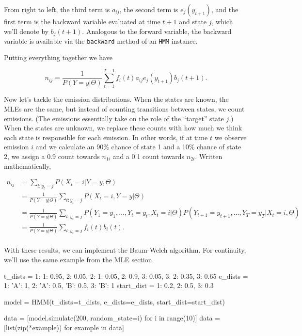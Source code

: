 From right to left, the third term is $a_{ij}$, the second term is $e_j(y_{t+1})$, and the first term is the backward variable evaluated at time $t+1$ and state $j$, which we'll denote by $b_j(t+1)$. Analogous to the forward variable, the backward variable is available via the \texttt{backward} method of an \texttt{HMM} instance.

Putting everything together we have

\begin{equation*}
n_{ij} = \frac{1}{P(Y=y|\Theta)} \sum_{t=1}^{T-1} f_i(t)a_{ij}e_j(y_{t+1})b_j(t+1).
\end{equation*}

Now let's tackle the emission distributions. When the states are known, the MLEs are the same, but instead of counting transitions between states, we count emissions. (The emissions essentially take on the role of the ``target'' state $j$.) When the states are unknown, we replace these counts with how much we think each state is responsible for each emission. In other words, if at time $t$ we observe emission $i$ and we calculate an 90\% chance of state 1 and a 10\% chance of state 2, we assign a 0.9 count towards $n_{1i}$ and a 0.1 count towards $n_{2i}$. Written mathematically,

\begin{align*}
n_{ij}
&= \sum_{t: y_t=j} P(X_t=i|Y=y, \Theta) \\
&= \frac{1}{P(Y=y|\Theta)}
   \sum_{t: y_t=j} P(X_t=i, Y=y|\Theta) \\
&= \frac{1}{P(Y=y|\Theta)}
   \sum_{t: y_t=j} P(Y_1=y_1, \ldots, Y_t=y_t, X_t=i|\Theta)
                   P(Y_{t+1}=y_{t+1}, \ldots, Y_T=y_T| X_t=i, \Theta) \\
&= \frac{1}{P(Y=y|\Theta)}
   \sum_{t: y_t=j} f_i(t)b_i(t). \\
\end{align*}

With these results, we can implement the Baum-Welch algorithm. For continuity, we'll use the same example from the MLE section.

\begin{NotebookIn}
t_dists = {1: {1: 0.95, 2: 0.05},
           2: {1: 0.05, 2: 0.9, 3: 0.05},
           3: {2: 0.35, 3: 0.65}}
e_dists = {1: {'A': 1},
           2: {'A': 0.5, 'B': 0.5},
           3: {'B': 1}}
start_dist = {1: 0.2, 2: 0.5, 3: 0.3}

model = HMM(t_dists=t_dists, e_dists=e_dists, start_dist=start_dist)

data = [model.simulate(200, random_state=i) for i in range(10)]
data = [list(zip(*example)) for example in data]
\end{NotebookIn}

